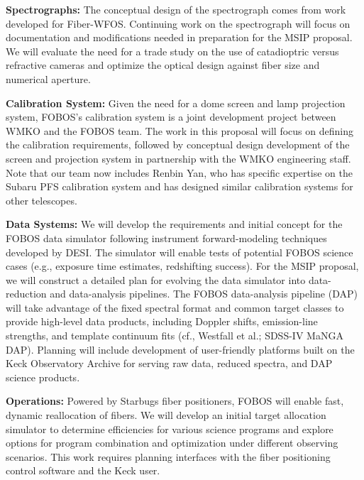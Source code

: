 \noindent \textbf{Spectrographs:} The conceptual design of the
spectrograph comes from work developed for Fiber-WFOS. Continuing
work on the spectrograph will focus on documentation and
modifications needed in preparation for the MSIP proposal. We will
evaluate the need for a trade study on the use of catadioptric versus
refractive cameras and optimize the optical design against fiber size
and numerical aperture.

\noindent \textbf{Calibration System:} Given the need for a dome
screen and lamp projection system, FOBOS's calibration system is a
joint development project between WMKO and the FOBOS team. The work
in this proposal will focus on defining the calibration requirements,
followed by conceptual design development of the screen and
projection system in partnership with the WMKO engineering staff.
Note that our team now includes Renbin Yan, who has specific
expertise on the Subaru PFS calibration system and has designed
similar calibration systems for other telescopes.


\noindent \textbf{Data Systems:} We will develop the requirements and
initial concept for the FOBOS data simulator following instrument
forward-modeling techniques developed by DESI. The simulator will
enable tests of potential FOBOS science cases (e.g., exposure time
estimates, redshifting success). For the MSIP proposal, we will
construct a detailed plan for evolving the data simulator into
data-reduction and data-analysis pipelines. The FOBOS data-analysis
pipeline (DAP) will take advantage of the fixed spectral format and
common target classes to provide high-level data products, including
Doppler shifts, emission-line strengths, and template continuum fits
(cf., Westfall et al.; SDSS-IV MaNGA DAP). Planning will include
development of user-friendly platforms built on the Keck Observatory
Archive for serving raw data, reduced spectra, and DAP science
products.

\noindent \textbf{Operations:} Powered by Starbugs fiber positioners,
FOBOS will enable fast, dynamic reallocation of fibers. We will
develop an initial target allocation simulator to determine
efficiencies for various science programs and explore options for
program combination and optimization under different observing
scenarios. This work requires planning interfaces with the fiber
positioning control software and the Keck user.

